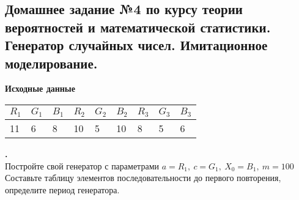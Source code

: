 \documentclass{article}
\begin{document}
\begin{center}

\section*{Домашнее задание №4 по курсу теории вероятностей и математической статистики. \\ Генератор случайных чисел. Имитационное моделирование.}

\vspace{\baselineskip}
\textbf{\large Исходные данные}
\vspace{\baselineskip}

\begin{tabular}[c]{p{0.5cm}|p{0.5cm}|p{0.5cm}|p{0.5cm}|p{0.5cm}|p{0.5cm}|p{0.5cm}|p{0.5cm}|p{0.5cm}}
\textbf{\begin{math}R_1\end{math}} & \textbf{\begin{math}G_1\end{math}} & \textbf{\begin{math}B_1\end{math}} & \textbf{\begin{math}R_2\end{math}} & \textbf{\begin{math}G_2\end{math}} & \textbf{\begin{math}B_2\end{math}} & \textbf{\begin{math}R_3\end{math}} & \textbf{\begin{math}G_3\end{math}} & \textbf{\begin{math}B_3\end{math}} 
\\[1mm] \hline
11 & 6 & 8 & 10 & 5 & 10 & 8 & 5 & 6  
\end{tabular}
\end{center}
\newpage
\noindent\textbf {.} 
\vspace{\baselineskip}
\\
\large Постройте свой генератор с параметрами \begin{math}a = R_1,\ c = G_1,\ X_0 = B_1,\ m = 100\end{math}
Составьте таблицу элементов
последовательности до первого повторения, определите период генератора. 
\vspace{\baselineskip}
\\
\end{document}
